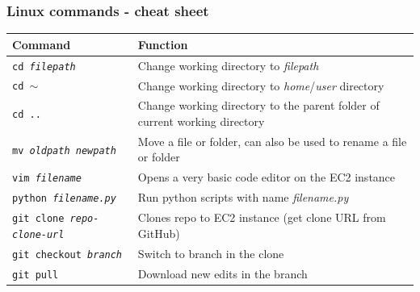 \documentclass[aspectratio=169]{beamer} %
\begin{document}
\begin{frame}
	\frametitle{Linux commands - cheat sheet}
	\vspace{-.6cm}
	\begin{table}
		\begin{tabular}{p{}p{}}
			Command & Function \\
			\hline \hline
			\texttt{cd \textit{filepath}} & Change working directory to \textit{filepath}  \\ 
			\texttt{cd $\sim$} & Change working directory to \textit{home}/\textit{user} directory \\
			\texttt{cd ..} & Change working directory to the parent folder of current working directory \\
			\texttt{mv \textit{oldpath} \textit{newpath}} & Move a file or folder, can also be used to rename a file or folder \\			
			\texttt{vim \textit{filename}} & Opens a very basic code editor on the EC2 instance \\  
			\texttt{python \textit{filename.py}} & Run python scripts with name \textit{filename.py} \\
			\texttt{git clone \textit{repo-clone-url}} & Clones repo to EC2 instance (get clone URL from GitHub) \\
			\texttt{git checkout \textit{branch}} & Switch to branch in the clone\\
			\texttt{git pull} & Download new edits in the branch  \\						
			
		\end{tabular}

	\end{table}
	
\end{frame}
\end{document}
